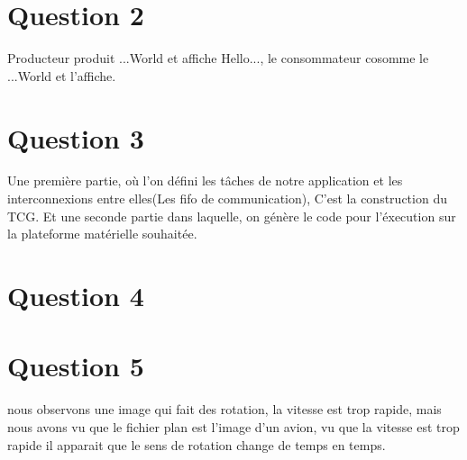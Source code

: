 \documentclass[12pt]{article}
\begin{document}
\section*{Question 2}
Producteur produit ...World et affiche Hello..., le consommateur cosomme le ...World et l'affiche.

\section*{Question 3}
Une première partie, où l'on défini les tâches de notre application et les interconnexions entre elles(Les fifo de communication), C'est la construction du TCG. Et une seconde partie dans laquelle, on génère le code pour l'éxecution sur la plateforme matérielle souhaitée.
\section*{Question 4}

\section*{Question 5}
nous observons une image qui fait des rotation, la vitesse est trop rapide, mais nous avons vu que le fichier plan est l'image d'un avion,
vu que la vitesse est trop rapide il apparait que le sens de rotation change de temps en temps.
\end{document}
